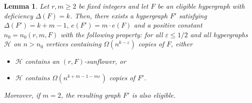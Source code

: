 \documentclass{daj}
\def\eps{\varepsilon}
\def\cH{\mathcal{H}}
\theoremstyle{plain}
\newtheorem{lemma}[theorem]{Lemma}
\theoremstyle{remark}
\begin{document}
\begin{lemma}\label{lemma:iteration step}
Let $r, m\geq 2$ be fixed integers and let $F$ be an eligible hypergraph with deficiency $\Delta(F)=k$. Then, there exists a hypergraph $F'$ satisfying $\Delta(F')=k+m-1$, $e(F')=m\cdot  e(F)$ and a positive constant $n_0=n_0(r,m,F)$ with the following property: for all $\eps\leq 1/2$ and all hypergraphs $\cH$ on $n>n_0$ vertices containing $\Omega(n^{k-\eps})$ copies of $F$, either
\begin{itemize}
    \item $\cH$ contains an $(r, F)$-sunflower, or
    \item $\cH$ contains $\Omega(n^{k+m-1-m\eps})$ copies of $F'$.
\end{itemize}
Moreover, if $m=2$, the resulting graph $F'$ is also eligible.
\end{lemma}
\end{document}
